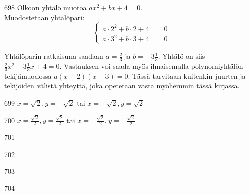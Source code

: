 \begin{Vastaus}{698}
		Olkoon yhtälö muotoa $ax^2+bx+4=0$. \\
      Muodostetaan yhtälöpari:
      \[
        \left\{
          \begin{aligned}
            a\cdot 2^2 + b\cdot 2 + 4 &= 0 \\
            a\cdot 3^2 + b\cdot 3 + 4 &= 0
          \end{aligned}
        \right.
      \]

      Yhtälöparin ratkaisuna saadaan $a=\frac23$ ja $b=-3\frac13$. Yhtälö on siis $\frac{2}{3}x^2-3\frac{1}{3}x+4=0$. Vastauksen voi saada myös ilmaisemalla polynomiyhtälön tekijämuodossa $a(x-2)(x-3)=0$. Tässä tarvitaan kuitenkin juurten ja tekijöiden välistä yhteyttä, joka opetetaan vasta myöhemmin tässä kirjassa.
    
\end{Vastaus}
\begin{Vastaus}{699}
        $x=\sqrt{2}, y=-\sqrt{2}$ tai $x=-\sqrt{2}, y=\sqrt{2}$
    
\end{Vastaus}
\begin{Vastaus}{700}
        $x=\frac{\sqrt{2}}{2}, y=\frac{\sqrt{2}}{2}$ tai $x=-\frac{\sqrt{2}}{2}, y=-\frac{\sqrt{2}}{2}$
    
\end{Vastaus}
\begin{Vastaus}{701}
    
\end{Vastaus}
\begin{Vastaus}{702}
    
\end{Vastaus}
\begin{Vastaus}{703}
    
\end{Vastaus}
\begin{Vastaus}{704}
    
\end{Vastaus}
